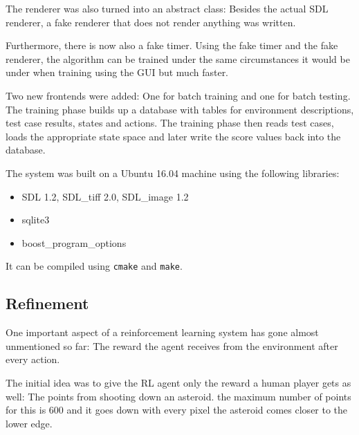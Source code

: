 \documentclass[a4paper,10pt]{article}
\begin{document}
The renderer was also turned into an abstract class:
Besides the actual SDL renderer, a fake renderer that does not render anything was written.

Furthermore, there is now also a fake timer.
Using the fake timer and the fake renderer, the algorithm can be trained under the same circumstances it would be under when training using the GUI but much faster.

Two new frontends were added: One for batch training and one for batch testing.
The training phase builds up a database with tables for environment descriptions, test case results, states and actions.
The training phase then reads test cases, loads the appropriate state space and later write the score values back into the database.

The system was built on a Ubuntu 16.04 machine using the following libraries:
\begin{itemize}
 \item SDL 1.2, SDL\_tiff 2.0, SDL\_image 1.2
 \item sqlite3
 \item boost\_program\_options
\end{itemize}
It can be compiled using \texttt{cmake} and \texttt{make}.


\subsection{Refinement}

One important aspect of a reinforcement learning system has gone almost unmentioned so far: The reward the agent receives from the environment after every action.

The initial idea was to give the RL agent only the reward a human player gets as well: The points from shooting down an asteroid.
the maximum number of points for this is 600 and it goes down with every pixel the asteroid comes closer to the lower edge.
\end{document}
